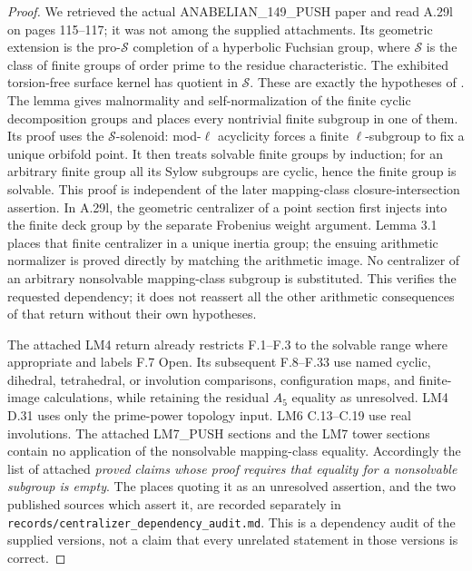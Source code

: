 \begin{proof}
We retrieved the actual ANABELIAN\_149\_PUSH paper and read
A.29l on pages 115--117; it was not among the supplied attachments.
Its geometric extension is the pro-$\mathscr S$ completion of a
hyperbolic Fuchsian group, where $\mathscr S$ is the class of
finite groups of order prime to the residue characteristic.
The exhibited torsion-free surface kernel has quotient in
$\mathscr S$. These are exactly the hypotheses of
\citet[Lemma 3.1]{BoggiZalesskii2019}.
The lemma gives malnormality and self-normalization of the
finite cyclic decomposition groups and places every nontrivial
finite subgroup in one of them. Its proof uses the
$\mathscr S$-solenoid: mod-$\ell$ acyclicity forces a finite
$\ell$-subgroup to fix a unique orbifold point. It then treats
solvable finite groups by induction; for an arbitrary finite
group all its Sylow subgroups are cyclic, hence the finite
group is solvable. This proof is independent of the later
mapping-class closure-intersection assertion.
In A.29l, the geometric centralizer of a point section first
injects into the finite deck group by the separate Frobenius
weight argument. Lemma 3.1 places that finite centralizer in a
unique inertia group; the ensuing arithmetic normalizer is
proved directly by matching the arithmetic image. No centralizer
of an arbitrary nonsolvable mapping-class subgroup is substituted.
This verifies the requested dependency; it does not reassert
all the other arithmetic consequences of that return without
their own hypotheses.

The attached LM4 return already restricts F.1--F.3 to the
solvable range where appropriate and labels F.7 Open.
Its subsequent F.8--F.33 use named cyclic, dihedral, tetrahedral,
or involution comparisons, configuration maps, and finite-image
calculations, while retaining the residual $A_5$ equality as
unresolved. LM4 D.31 uses only the prime-power topology input.
LM6 C.13--C.19 use real involutions. The attached LM7\_PUSH
sections and the LM7 tower sections contain no application of
the nonsolvable mapping-class equality.
Accordingly the list of attached \emph{proved claims whose
proof requires that equality for a nonsolvable subgroup is empty}.
The places quoting it as an unresolved assertion, and the two
published sources which assert it, are recorded separately in
\texttt{records/centralizer\_dependency\_audit.md}.
This is a dependency audit of the supplied versions, not a
claim that every unrelated statement in those versions is correct.
\end{proof}

